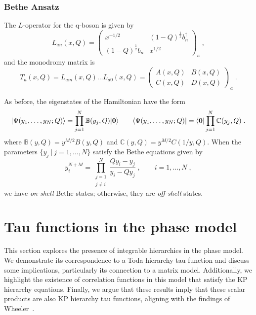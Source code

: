 \documentclass[a4paper,11pt]{amsart}
\begin{document}

\subsubsection{Bethe Ansatz}
The \(L\)-operator for the q-boson is given by
\begin{equation}
  L_{an}(x, Q) =
  \begin{pmatrix}
    x^{-1/2} & (1 - Q)^{\frac{1}{2}} b_n^\dagger \\ (1 - Q)^{\frac{1}{2}} b_n & x^{1/2}
  \end{pmatrix}_a\; ,
\end{equation}
and the monodromy matrix is 
\begin{equation}
  T_a(x,Q) = L_{am}(x, Q)  \dots  L_{a0}(x, Q) = 
  \begin{pmatrix}
    A(x, Q) & B(x, Q) \\ C(x, Q) & D(x, Q)
  \end{pmatrix}_a\; .
\end{equation}

As before, the eigenstates of the Hamiltonian have the form
\begin{equation}
  \lvert\Psi(y_1, \dots, y_N; Q)\rangle = \prod_{j=1}^N \mathbb{B}(y_j, Q) \lvert\bm{0}\rangle\qquad 
  \langle\Psi(y_1, \dots, y_N; Q)\rvert = \langle\bm{0}\rvert\prod_{j=1}^N \mathbb{C}(y_j, Q) \; .
\end{equation}
where \(\mathbb{B}(y, Q) = y^{M/2} B(y, Q)\) and \(\mathbb{C}(y, Q) =
y^{M/2} C(1/y, Q)\). When the parameters \(\{ y_j \ | \ j =1, \dots , N\}\)
satisfy the Bethe equations given by
\begin{equation}
  y^{N + M}_i =\prod_{\substack{j = 1 \\ j \neq i}}^N\frac{Q y_i - y_j}{y_i - Q y_j}\; , \qquad i = 1, \dots, N\; , 
\end{equation}
we have \emph{on-shell} Bethe states; otherwise, they are \emph{off-shell} states.



\section{Tau functions in the phase model}

This section explores the presence of integrable hierarchies in the
phase model. We demonstrate its correspondence to a Toda hierarchy tau
function and discuss some implications, particularly its connection to
a matrix model. Additionally, we highlight the existence of
correlation functions in this model that satisfy the KP hierarchy
equations. Finally, we argue that these results imply that these
scalar products are also KP hierarchy tau functions, aligning with the
findings of Wheeler~\cite{Wheeler:2010vmq}.
\end{document}
